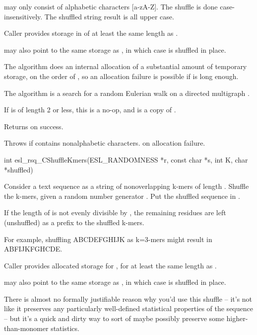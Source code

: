 \begin{sreapi}
 may only consist of alphabetic characters [a-zA-Z].
The shuffle is done case-insensitively. The shuffled
string result is all upper case.

Caller provides storage in  of at least the
same length as .

 may also point to the same storage as ,
in which case  is shuffled in place.

The algorithm does an internal allocation of a
substantial amount of temporary storage, on the order of
, so an allocation failure is possible
if  is long enough.

The algorithm is a search for a random Eulerian walk on
a directed multigraph \citep{AltschulErickson85}.

If  is of length 2 or less, this is a no-op, and
 is a copy of .

Returns  on success.

Throws  if  contains nonalphabetic characters.
 on allocation failure.


\hypertarget{func:esl_rsq_CShuffleKmers()}
{\item[int esl\_rsq\_CShuffleKmers(ESL\_RANDOMNESS *r, const char *s, int K, char *shuffled)]}

Consider a text sequence  as a string of nonoverlapping
k-mers of length . Shuffle the k-mers, given a random
number generator . Put the shuffled sequence in
.

If the length of  is not evenly divisible by , the
remaining residues are left (unshuffled) as a prefix to
the shuffled k-mers.

For example, shuffling ABCDEFGHIJK as k=3-mers might
result in ABFIJKFGHCDE.

Caller provides allocated storage for ,
for at least the same length as . 

 may also point to the same storage as ,
in which case  is shuffled in place.

There is almost no formally justifiable reason why you'd
use this shuffle -- it's not like it preserves any
particularly well-defined statistical properties of the
sequence -- but it's a quick and dirty way to sort of
maybe possibly preserve some higher-than-monomer
statistics.


\end{sreapi}

